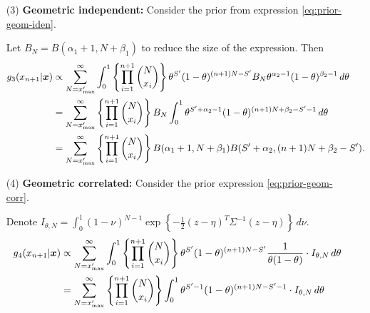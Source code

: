 \begin{enumerate}
        \item[(3)] {\bf Geometric independent:} Consider the prior from
        expression \ref{eq:prior-geom-iden}. 

        Let $B_N = B(\alpha_1+1,N+\beta_1)$ to reduce the size of the
        expression. Then
        \begin{equation*}
            \begin{split}
                g_3(x_{n+1}|\boldsymbol{x}) &\propto \sum_{N=x'_{\max}}^{\infty} \int_0^1 \left\{\prod_{i=1}^{n+1}\binom{N}{x_i}\right\}\theta^{S'}(1-\theta)^{(n+1)N-S'}B_N\theta^{\alpha_2-1}(1-\theta)^{\beta_2-1} \,d\theta \\
                &= \sum_{N=x'_{\max}}^{\infty} \left\{\prod_{i=1}^{n+1}\binom{N}{x_i}\right\}  B_N \int_0^1 \theta^{S'+\alpha_2-1}(1-\theta)^{(n+1)N+\beta_2-S'-1} \, d\theta \\
                &= \sum_{N=x'_{\max}}^{\infty} \left\{\prod_{i=1}^{n+1}\binom{N}{x_i}\right\} B(\alpha_1 + 1, N + \beta_1) B(S' + \alpha_2, (n+1)N + \beta_2 - S'). 
            \end{split}
        \end{equation*}
        
        \item[(4)] {\bf Geometric correlated:} Consider the prior expression
        \ref{eq:prior-geom-corr}. 
        
        Denote $I_{\theta, N} = \int_0^1
        (1-\nu)^{N-1}\exp\left\{-\frac{1}{2}(z -
        \eta)^T\Sigma^{-1}(z-\eta)\right\} \, d\nu$. 
        \begin{equation*}
            \begin{split}
                g_4(x_{n+1}|\boldsymbol{x}) &\propto \sum_{N=x'_{\max}}^{\infty} \int_0^1 \left\{\prod_{i=1}^{n+1}\binom{N}{x_i}\right\}\theta^{S'}(1-\theta)^{(n+1)N-S'} \frac{1}{\theta(1-\theta)} \cdot I_{\theta, N} \, d\theta\\ 
                &= \sum_{N=x'_{\max}}^{\infty} \left\{\prod_{i=1}^{n+1}\binom{N}{x_i}\right\} \int_0^1 \theta^{S'-1}(1-\theta)^{(n+1)N-S'-1} \cdot I_{\theta, N} \, d\theta   
            \end{split}
        \end{equation*} 
    \end{enumerate}

